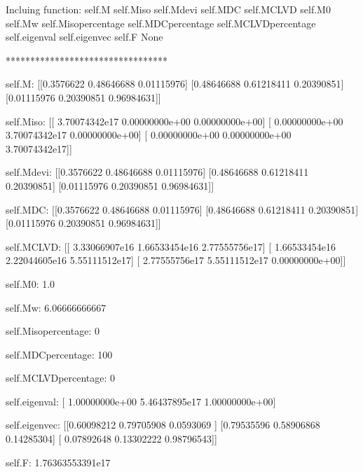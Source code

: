\documentclass[a4paper,10pt,english,openany]{sphinxmanual}
\begin{document}
\begin{sphinxVerbatim}[commandchars=\\\{\},numbers=left,firstnumber=1,stepnumber=1]
Incluing function:
self.M
self.M\PYGZus{}iso
self.M\PYGZus{}devi
self.M\PYGZus{}DC
self.M\PYGZus{}CLVD
self.M0
self.Mw
self.M\PYGZus{}iso\PYGZus{}percentage
self.M\PYGZus{}DC\PYGZus{}percentage
self.M\PYGZus{}CLVD\PYGZus{}percentage
self.eigen\PYGZus{}val
self.eigen\PYGZus{}vec
self.F
None


*********************************


self.M: [[\PYGZhy{}0.3576622  \PYGZhy{}0.48646688 \PYGZhy{}0.01115976]
 [\PYGZhy{}0.48646688 \PYGZhy{}0.61218411  0.20390851]
 [\PYGZhy{}0.01115976  0.20390851  0.96984631]] 

self.M\PYGZus{}iso: [[ \PYGZhy{}3.70074342e\PYGZhy{}17   0.00000000e+00   0.00000000e+00]
 [  0.00000000e+00  \PYGZhy{}3.70074342e\PYGZhy{}17   0.00000000e+00]
 [  0.00000000e+00   0.00000000e+00  \PYGZhy{}3.70074342e\PYGZhy{}17]] 

self.M\PYGZus{}devi: [[\PYGZhy{}0.3576622  \PYGZhy{}0.48646688 \PYGZhy{}0.01115976]
 [\PYGZhy{}0.48646688 \PYGZhy{}0.61218411  0.20390851]
 [\PYGZhy{}0.01115976  0.20390851  0.96984631]] 

self.M\PYGZus{}DC: [[\PYGZhy{}0.3576622  \PYGZhy{}0.48646688 \PYGZhy{}0.01115976]
 [\PYGZhy{}0.48646688 \PYGZhy{}0.61218411  0.20390851]
 [\PYGZhy{}0.01115976  0.20390851  0.96984631]] 

self.M\PYGZus{}CLVD: [[  3.33066907e\PYGZhy{}16   1.66533454e\PYGZhy{}16  \PYGZhy{}2.77555756e\PYGZhy{}17]
 [  1.66533454e\PYGZhy{}16  \PYGZhy{}2.22044605e\PYGZhy{}16   5.55111512e\PYGZhy{}17]
 [ \PYGZhy{}2.77555756e\PYGZhy{}17   5.55111512e\PYGZhy{}17   0.00000000e+00]] 

self.M0: 1.0 

self.Mw: \PYGZhy{}6.06666666667 

self.M\PYGZus{}iso\PYGZus{}percentage: 0 

self.M\PYGZus{}DC\PYGZus{}percentage: 100 

self.M\PYGZus{}CLVD\PYGZus{}percentage: 0 

self.eigen\PYGZus{}val: [ \PYGZhy{}1.00000000e+00  \PYGZhy{}5.46437895e\PYGZhy{}17   1.00000000e+00] 

self.eigen\PYGZus{}vec: [[\PYGZhy{}0.60098212 \PYGZhy{}0.79705908 \PYGZhy{}0.0593069 ]
 [\PYGZhy{}0.79535596  0.58906868  0.14285304]
 [ 0.07892648 \PYGZhy{}0.13302222  0.98796543]] 

self.F: \PYGZhy{}1.76363553391e\PYGZhy{}17 
\end{sphinxVerbatim}
\end{document}
